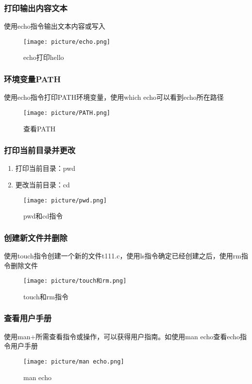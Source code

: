 \documentclass[UTF8]{ctexart}
\begin{document}
\subsubsection{打印输出内容文本}
使用echo指令输出文本内容或写入

\begin{figure}[H]
    \centering
    \texttt{[image: picture/echo.png]}
    \caption{echo打印hello}
\end{figure}

\subsubsection{环境变量PATH}
使用echo指令打印PATH环境变量，使用which echo可以看到echo所在路径

\begin{figure}[H]
    \centering
    \texttt{[image: picture/PATH.png]}
    \caption{查看PATH}
\end{figure}

\subsubsection{打印当前目录并更改}
\begin{enumerate}
    \item 打印当前目录：pwd
    \item 更改当前目录：cd
\end{enumerate}

\begin{figure}[H]
    \centering
    \texttt{[image: picture/pwd.png]}
    \caption{pwd和cd指令}
\end{figure}

\subsubsection{创建新文件并删除}
使用touch指令创建一个新的文件t111.c，使用ls指令确定已经创建之后，使用rm指令删除文件
\begin{figure}[H]
    \centering
    \texttt{[image: picture/touch和rm.png]}
    \caption{touch和rm指令}
\end{figure}

\subsubsection{查看用户手册}
使用man+所需查看指令或操作，可以获得用户指南。如使用man echo查看echo指令用户手册
\begin{figure}[H]
    \centering
    \texttt{[image: picture/man echo.png]}%
    \caption{man echo}
\end{figure}
\end{document}
